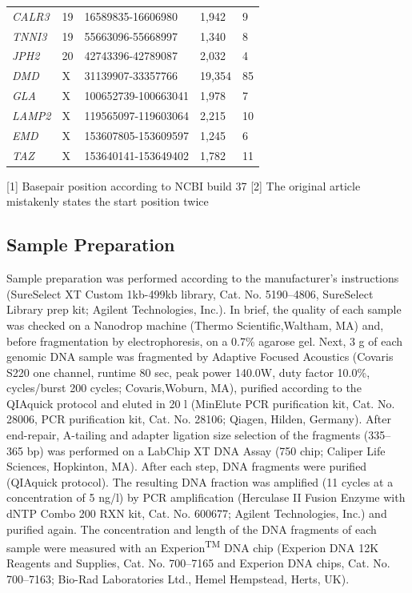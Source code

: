 \begin{table}[H]
\begin{minipage}{\textwidth}
{\begin{tabulary}{\linewidth}{p{1cm}p{1.3cm}p{2.7cm}p{2cm}p{2cm}}
		\rule{0pt}{1ex} \textsl{CALR3} & 19 & 16589835-16606980 & 1,942 & 9 \\
		\rule{0pt}{1ex} \textsl{TNNI3} & 19 & 55663096-55668997 & 1,340 & 8 \\
		\rule{0pt}{1ex} \textsl{JPH2} & 20 & 42743396-42789087 & 2,032 & 4 \\
		\rule{0pt}{1ex} \textsl{DMD} & X & 31139907-33357766 & 19,354 & 85 \\
		\rule{0pt}{1ex} \textsl{GLA} & X & 100652739-100663041 & 1,978 & 7 \\
		\rule{0pt}{1ex} \textsl{LAMP2} & X & 119565097-119603064 & 2,215 & 10 \\
		\rule{0pt}{1ex} \textsl{EMD} & X & 153607805-153609597 & 1,245 & 6 \\
		\rule{0pt}{1ex} \textsl{TAZ} & X & 153640141-153649402 & 1,782 & 11 \\
		\hline
	\end{tabulary}}
\tiny{ [1] Basepair position according to NCBI build 37}
\tiny{ [2] The original article mistakenly states the start position twice}
\end{minipage}
\end{table}

\subsection{Sample Preparation}
Sample preparation was performed according to the manufacturer’s instructions (SureSelect XT Custom 1kb-499kb library, Cat. No. 5190–4806, SureSelect Library prep kit; Agilent Technologies, Inc.).
In brief, the quality of each sample was checked on a Nanodrop machine (Thermo Scientific,Waltham, MA) and, before fragmentation by electrophoresis, on a 0.7\% agarose gel. 
Next, 3 {\textmu}g of each genomic DNA sample was fragmented by Adaptive Focused Acoustics (Covaris S220 one channel, runtime 80 sec, peak power 140.0W, duty factor 10.0\%, cycles/burst 200 cycles; Covaris,Woburn, MA), purified according to the QIAquick protocol and eluted in 20 {\textmu}l (MinElute PCR purification kit, Cat. No. 28006, PCR purification kit, Cat. No. 28106; Qiagen, Hilden, Germany). 
After end-repair, A-tailing and adapter ligation size selection of the fragments (335– 365 bp) was performed on a LabChip XT DNA Assay (750 chip; Caliper Life Sciences, Hopkinton, MA). 
After each step, DNA fragments were purified (QIAquick protocol). 
The resulting DNA fraction was amplified (11 cycles at a concentration of 5 ng/{\textmu}l) by PCR amplification (Herculase II Fusion Enzyme with dNTP Combo 200 RXN kit, Cat. No. 600677; Agilent Technologies, Inc.) and purified again. 
The concentration and length of the DNA fragments of each sample were measured with an Experion\textsuperscript{TM} DNA chip (Experion DNA 12K Reagents and Supplies, Cat. No. 700–7165 and Experion DNA chips, Cat. No. 700–7163; Bio-Rad Laboratories Ltd., Hemel Hempstead, Herts, UK).


